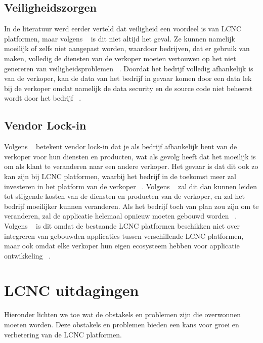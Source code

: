 \subsection*{Veiligheidszorgen}
\label{subsec:veiligheidszorgen}
In de literatuur werd eerder verteld dat veiligheid een voordeel is van LCNC platformen, maar volgens ~\textcite{Yan2021} is dit niet altijd het geval. Ze kunnen namelijk moeilijk of zelfs niet aangepast worden, waardoor bedrijven, dat er gebruik van maken,
volledig de diensten van de verkoper moeten vertouwen op het niet genereren van veiligheidsproblemen ~\autocite{Yan2021}. Doordat het bedrijf volledig afhankelijk is van de verkoper, kan de data van het bedrijf in gevaar komen door een data lek bij de verkoper omdat namelijk de data security
en de source code niet beheerst wordt door het bedrijf ~\autocite{Yan2021}.

\subsection*{Vendor Lock-in}
\label{subsec:technische-schulden}
Volgens ~\textcite{Yan2021} betekent vendor lock-in dat je als bedrijf afhankelijk bent van de verkoper voor hun diensten en producten, wat als gevolg heeft dat het moeilijk is om als klant te veranderen naar een andere verkoper.
Het gevaar is dat dit ook zo kan zijn bij LCNC platformen, waarbij het bedrijf in de toekomst meer zal investeren in het platform van de verkoper ~\autocite{Yan2021}. Volgens ~\textcite{Yan2021} zal dit dan kunnen leiden tot stijgende kosten van de diensten en producten van de verkoper, en zal het bedrijf
moeilijker kunnen veranderen. Als het bedrijf toch van plan zou zijn om te veranderen, zal de applicatie helemaal opnieuw moeten gebouwd worden ~\autocite{Sufi_2023}. Volgens ~\textcite{Sufi_2023} is dit omdat de bestaande LCNC platformen beschikken niet over integreren van gebouwden applicaties tussen verschillende LCNC platformen, maar
ook omdat elke verkoper hun eigen ecosysteem hebben voor applicatie ontwikkeling ~\autocite{Sufi_2023}.


\section{LCNC uitdagingen}
\label{sec:lcnc-uitdagingen}
Hieronder lichten we toe wat de obstakels en problemen zijn die overwonnen moeten worden. Deze obstakels en problemen bieden een kans voor groei en
verbetering van de LCNC platformen.
